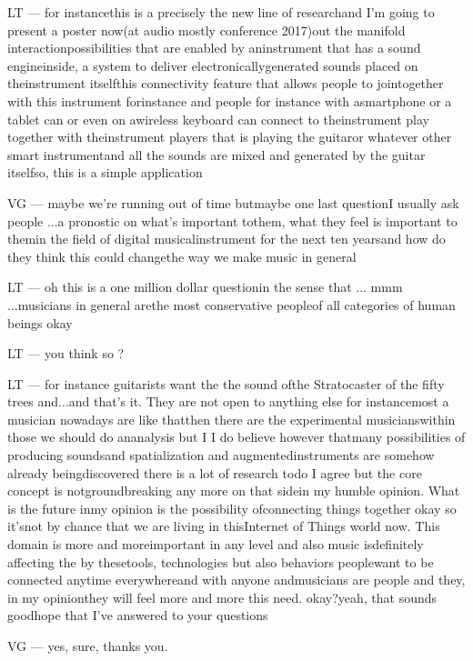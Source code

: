 LT — for instancethis is a precisely the new line of researchand I'm going to present a poster now(at audio mostly conference  2017)out the manifold interactionpossibilities that are enabled by aninstrument that has a sound engineinside, a system to deliver electronicallygenerated sounds placed on theinstrument itselfthis connectivity feature that allows people to jointogether with this instrument forinstance and people for instance with asmartphone or a tablet can or even on awireless keyboard can connect to theinstrument play together with theinstrument players that is playing the guitaror whatever other smart instrumentand all the sounds are mixed and generated by the guitar itselfso, this is a simple application

VG — maybe we're running out of time butmaybe one last questionI usually ask people ...a pronostic on what's important tothem, what they feel is important to themin the field of digital musicalinstrument for the next ten yearsand how do they think this could changethe way we make music in general

LT — oh this is a one million dollar questionin the sense that ... mmm ...musicians in general arethe most conservative peopleof all categories of human beings okay

LT — you think so ?

LT — for instance guitarists want the the sound ofthe Stratocaster of the fifty trees and...and that's it. They are not open to anything else for instancemost a musician nowadays are like thatthen there are the experimental musicianswithin those we should do ananalysis but I I do believe however thatmany possibilities of producing soundsand spatialization and augmentedinstruments are somehow already beingdiscovered there is a lot of research todo I agree but the core concept is notgroundbreaking any more on that sidein my humble opinion. What is the future inmy opinion is the possibility ofconnecting things together okay so it'snot by chance that we are living in thisInternet of Things world now. This domain is more and moreimportant in any level and also music isdefinitely affecting the by thesetools, technologies but also behaviors peoplewant to be connected anytime everywhereand with anyone andmusicians are people and they, in my opinionthey will feel more and more this need. okay?yeah, that sounds goodhope that I've answered to your questions

VG — yes, sure, thanks you.